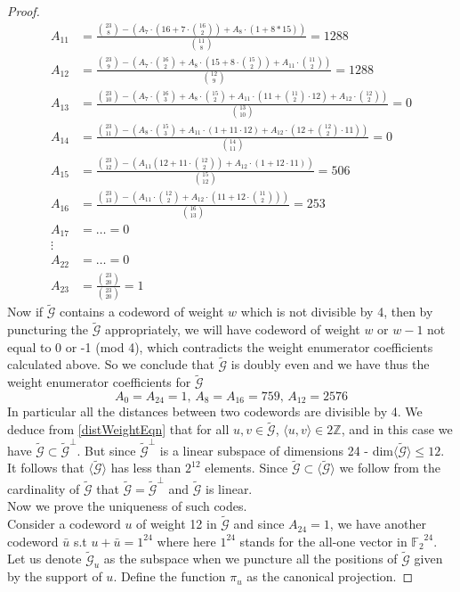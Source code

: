 \documentclass[12pt]{article}
\theoremstyle{definition}
\numberwithin{equation}{theorem}
\numberwithin{figure}{theorem}
\newcommand{\cCodes}{\ensuremath{\widetilde{\mathcal{G}}}}
\newcommand{\cCodesVertical}{\cCodes^{\bot}}
\newcommand{\ftwoN}[1]{\ensuremath{\mathbb{F}_2}^{#1}}
\newcommand{\Integer}{\ensuremath{\mathbb{Z}}}
\begin{document}
\begin{proof}
\begin{align*}
		A_{11} &= \frac{\binom{23}{8} - (A_7\cdot(16 + 7\cdot \binom{16}{2}) + A_8\cdot(1 + 8 * 15))}{\binom{11}{8}} = 1288\\
		A_{12} &= \frac{\binom{23}{9} - (A_7\cdot\binom{16}{2} + A_8\cdot(15 + 8 \cdot \binom{15}{2}) + A_{11}\cdot\binom{11}{2})}{\binom{12}{9}} = 1288 \\
		A_{13} &= \frac{\binom{23}{10} - (A_7\cdot\binom{16}{3} + A_8 \cdot \binom{15}{2} + A_{11} \cdot(11 + \binom{11}{2} \cdot 12) + A_{12} \cdot \binom{12}{2})}{\binom{13}{10}} = 0\\
		A_{14} &= \frac{\binom{23}{11} - (A_8 \cdot \binom{15}{3} + A_{11} \cdot(1 + 11 \cdot 12) + A_{12} \cdot(12 + \binom{12}{2} \cdot 11))}{\binom{14}{11}} = 0\\
		A_{15} &= \frac{\binom{23}{12} - (A_{11}(12 + 11 \cdot \binom{12}{2}) + A_{12}\cdot(1 + 12\cdot 11))}{\binom{15}{12}} = 506 \\
		A_{16} &= \frac{\binom{23}{13} - (A_{11} \cdot \binom{12}{2} + A_{12}\cdot(11 + 12 \cdot\binom{11}{2}))}{\binom{16}{13}} = 253\\
		A_{17} &= \ldots = 0 \\
		\vdots\\
		A_{22} &= \ldots = 0\\
		A_{23} &= \frac{\binom{23}{20}}{\binom{23}{20}} = 1
	\end{align*}
Now if {\cCodes} contains a codeword of weight $w$ which is not divisible by 4, then by puncturing the {\cCodes} appropriately, we will have codeword of weight $w$ or $w - 1$ not equal to 0 or -1 (mod 4), which contradicts the weight enumerator coefficients calculated above. So we conclude that {\cCodes} is doubly even and we have thus the weight enumerator coefficients for {\cCodes}
\[
	A_0 = A_{24} = 1, \, A_{8} = A_{16} = 759,\, A_{12} = 2576
\]
In particular all the distances between two codewords are divisible by 4. We deduce from \ref{distWeightEqn} that for all
$u,v \in \cCodes$, $\langle u, v\rangle \in 2\Integer$, and in this case we have $\cCodes \subset \cCodesVertical$. But since $\cCodesVertical$ is a linear subspace of dimensions 24 - dim$\langle \cCodes \rangle \leq 12$. It follows that $\langle \cCodes \rangle$ has less than $2^{12}$ elements. Since $\cCodes \subset \langle \cCodes \rangle$ we follow from the cardinality of $\cCodes$ that $\cCodes = \cCodesVertical$ and $\cCodes$ is linear.\\
Now we prove the uniqueness of such codes. \\
Consider a codeword $u$ of weight 12 in {\cCodes} and since $A_{24} = 1$, we have another codeword $\bar{u}$ s.t $u + \bar{u} = 1^{24}$ where here $1^{24}$ stands for the all-one vector in $\ftwoN{24}$. Let us denote $\cCodes_u$ as the subspace when we puncture all the positions of $\cCodes$ given by the support of $u$. Define the function $\pi_{u}$ as the canonical projection.

\end{proof}
\end{document}

